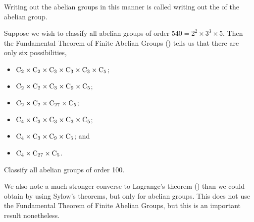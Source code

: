 Writing out the abelian groups in this manner is called writing out the  of the abelian group.

\begin{example}
    Suppose we wish to classify all abelian groups of order $540 = 2^2 \times 3^3 \times 5$. Then the Fundamental Theorem of Finite Abelian Groups () tells us that there are only six possibilities,
    \begin{multicols}{2}
        \begin{itemize}
            \item $\mathrm{C}_{2} \times \mathrm{C}_{2} \times \mathrm{C}_{3} \times \mathrm{C}_{3} \times \mathrm{C}_{3} \times \mathrm{C}_{5}$;
            \item $\mathrm{C}_{2} \times \mathrm{C}_{2} \times \mathrm{C}_{3} \times \mathrm{C}_{9} \times \mathrm{C}_{5}$;
            \item $\mathrm{C}_{2} \times \mathrm{C}_{2} \times \mathrm{C}_{27} \times \mathrm{C}_{5}$;
            \item $\mathrm{C}_{4} \times \mathrm{C}_{3} \times \mathrm{C}_{3} \times \mathrm{C}_{3} \times \mathrm{C}_{5}$;
            \item $\mathrm{C}_{4} \times \mathrm{C}_{3} \times \mathrm{C}_{9} \times \mathrm{C}_{5}$; and
            \item $\mathrm{C}_{4} \times \mathrm{C}_{27} \times \mathrm{C}_{5}$.
        \end{itemize}
    \end{multicols}
\end{example}

\begin{exercise}
    Classify all abelian groups of order 100.
\end{exercise}

We also note a much stronger converse to Lagrange's theorem () than we could obtain by using Sylow's theorems, but only for abelian groups. This does not use the Fundamental Theorem of Finite Abelian Groups, but this is an important result nonetheless.

